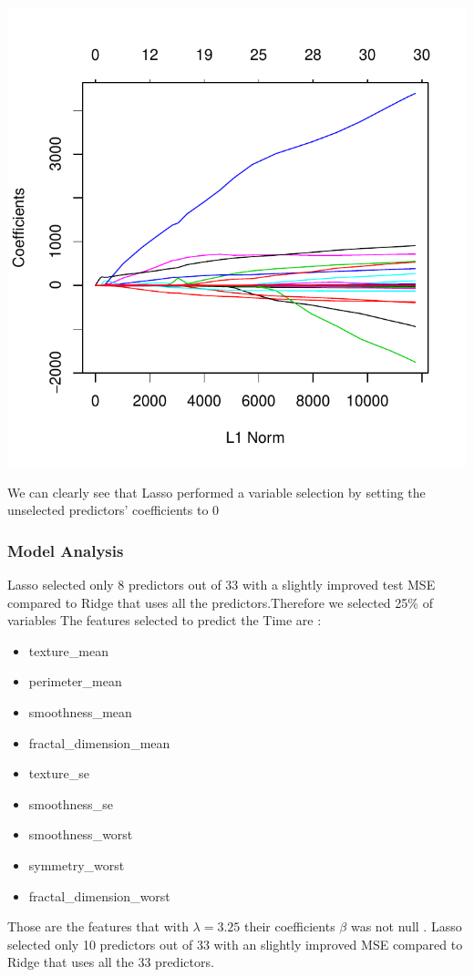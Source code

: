 \documentclass[]{report}
\begin{document}
\begin{center}
	\includegraphics[width=0.8\linewidth]{Figures/lasso_coeff}
\end{center}
We can clearly see that Lasso performed a variable selection by setting the unselected predictors' coefficients to 0

\subsubsection{Model Analysis}
 Lasso selected only 8 predictors out of 33 with a slightly improved test MSE compared to Ridge that uses all the predictors.Therefore we selected 25\% of variables The features selected to predict the Time are :
 \begin{itemize} 
 \item texture\_mean
 \item perimeter\_mean
 \item smoothness\_mean
 \item fractal\_dimension\_mean
 \item texture\_se
 \item smoothness\_se
 \item smoothness\_worst
 \item symmetry\_worst
 \item fractal\_dimension\_worst
\end{itemize}
Those are the features that with $\lambda = 3.25 $ their coefficients $\beta$ was not null .
Lasso selected only 10 predictors out of 33 with an slightly improved MSE compared to Ridge that uses all the 33 predictors.
\end{document}
